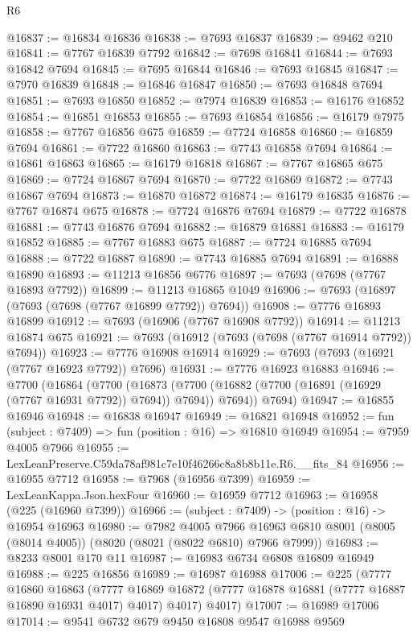 \begin{lexlean}{R6}
\begin{coremodule}
@16837 := @16834 @16836
@16838 := @7693 @16837
@16839 := @9462 @210
@16841 := @7767 @16839 @7792
@16842 := @7698 @16841
@16844 := @7693 @16842 @7694
@16845 := @7695 @16844
@16846 := @7693 @16845
@16847 := @7970 @16839
@16848 := @16846 @16847
@16850 := @7693 @16848 @7694
@16851 := @7693 @16850
@16852 := @7974 @16839
@16853 := @16176 @16852
@16854 := @16851 @16853
@16855 := @7693 @16854
@16856 := @16179 @7975
@16858 := @7767 @16856 @675
@16859 := @7724 @16858
@16860 := @16859 @7694
@16861 := @7722 @16860
@16863 := @7743 @16858 @7694
@16864 := @16861 @16863
@16865 := @16179 @16818
@16867 := @7767 @16865 @675
@16869 := @7724 @16867 @7694
@16870 := @7722 @16869
@16872 := @7743 @16867 @7694
@16873 := @16870 @16872
@16874 := @16179 @16835
@16876 := @7767 @16874 @675
@16878 := @7724 @16876 @7694
@16879 := @7722 @16878
@16881 := @7743 @16876 @7694
@16882 := @16879 @16881
@16883 := @16179 @16852
@16885 := @7767 @16883 @675
@16887 := @7724 @16885 @7694
@16888 := @7722 @16887
@16890 := @7743 @16885 @7694
@16891 := @16888 @16890
@16893 := @11213 @16856 @6776
@16897 := @7693 (@7698 (@7767 @16893 @7792))
@16899 := @11213 @16865 @1049
@16906 := @7693 (@16897 (@7693 (@7698 (@7767 @16899 @7792)) @7694))
@16908 := @7776 @16893 @16899
@16912 := @7693 (@16906 (@7767 @16908 @7792))
@16914 := @11213 @16874 @675
@16921 := @7693 (@16912 (@7693 (@7698 (@7767 @16914 @7792)) @7694))
@16923 := @7776 @16908 @16914
@16929 := @7693 (@7693 (@16921 (@7767 @16923 @7792)) @7696)
@16931 := @7776 @16923 @16883
@16946 := @7700
    (@16864
      (@7700
        (@16873 (@7700 (@16882 (@7700 (@16891 (@16929 (@7767 @16931 @7792)) @7694)) @7694)) @7694))
      @7694)
@16947 := @16855 @16946
@16948 := @16838 @16947
@16949 := @16821 @16948
@16952 := fun (subject : @7409) => fun (position : @16) => @16810 @16949
@16954 := @7959 @4005 @7966
@16955 := LexLeanPreserve.C59da78af981c7e10f46266c8a8b8b11e.R6.__fits_84
@16956 := @16955 @7712
@16958 := @7968 (@16956 @7399)
@16959 := LexLeanKappa.Json.hexFour
@16960 := @16959 @7712
@16963 := @16958 (@225 (@16960 @7399))
@16966 := (subject : @7409) -> (position : @16) -> @16954 @16963
@16980 := @7982
    @4005
    @7966
    @16963
    @6810
    @8001
    (@8005 (@8014 @4005))
    (@8020 (@8021 (@8022 @6810) @7966 @7999))
@16983 := @8233 @8001 @170 @11
@16987 := @16983 @6734 @6808 @16809 @16949
@16988 := @225 @16856
@16989 := @16987 @16988
@17006 := @225
    (@7777
      @16860
      @16863
      (@7777 @16869 @16872 (@7777 @16878 @16881 (@7777 @16887 @16890 @16931 @4017) @4017) @4017)
      @4017)
@17007 := @16989 @17006
@17014 := @9541 @6732 @679 @9450 @16808 @9547 @16988 @9569

\end{coremodule}
\end{lexlean}
